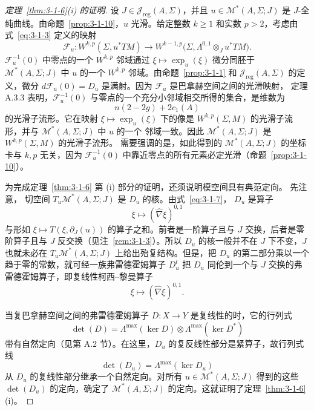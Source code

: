 \begin{proof}[定理~\ref{thm:3-1-6}\textup{(i)} 的证明]
设 $J\in\mathcal J_{\mathrm{reg}}(A,\Sigma)$，并且
$u\in\mathcal M^*(A,\Sigma;J)$ 是 $J$-全纯曲线。由命题~\ref{prop:3-1-10}，$u$
光滑。给定整数 $k\ge1$ 和实数 $p>2$，考虑由式~\eqref{eq:3-1-3} 定义的映射
\[
  \mathcal F_u:W^{k,p}(\Sigma,u^*TM)
  \longrightarrow
  W^{k-1,p}\bigl(\Sigma,
  \Lambda^{0,1}\otimes_Ju^*TM\bigr).
\]
$\mathcal F_u^{-1}(0)$ 中零点的一个 $W^{k,p}$ 邻域通过
$\xi\mapsto\exp_u(\xi)$ 微分同胚于 $\mathcal M^*(A,\Sigma;J)$ 中 $u$ 的一个
$W^{k,p}$ 邻域。由命题~\ref{prop:3-1-1} 和
$\mathcal J_{\mathrm{reg}}(A,\Sigma)$ 的定义，微分
$d\mathcal F_u(0)=D_u$ 是满射。因为 $\mathcal F_u$ 是巴拿赫空间之间的光滑映射，
定理 A.3.3 表明，$\mathcal F_u^{-1}(0)$ 与零点的一个充分小邻域相交所得的集合，是维数为
\[
  n(2-2g)+2c_1(A)
\]
的光滑子流形。它在映射 $\xi\mapsto\exp_u(\xi)$ 下的像是
$W^{k,p}(\Sigma,M)$ 的光滑子流形，并与 $\mathcal M^*(A,\Sigma;J)$ 中 $u$ 的一个
邻域一致。因此 $\mathcal M^*(A,\Sigma;J)$ 是 $W^{k,p}(\Sigma,M)$ 的光滑子流形。
需要强调的是，如此得到的 $\mathcal M^*(A,\Sigma;J)$ 的坐标卡与 $k,p$ 无关，因为
$\mathcal F_u^{-1}(0)$ 中靠近零点的所有元素必定光滑（命题~\ref{prop:3-1-10}）。

为完成定理~\ref{thm:3-1-6} 第 \textup{(i)} 部分的证明，还须说明模空间具有典范定向。
先注意，
切空间 $T_u\mathcal M^*(A,\Sigma;J)$ 是 $D_u$ 的核。由式~\eqref{eq:3-1-7}，
$D_u$ 是算子
\[
  \xi\longmapsto(\widehat\nabla\xi)^{0,1}
\]
与形如 $\xi\mapsto T(\xi,\partial_J(u))$ 的算子之和。前者是一阶算子且与 $J$
交换，后者是零阶算子且与 $J$ 反交换（见注~\ref{rem:3-1-3}）。所以 $D_u$ 的核一般并不在 $J$
下不变，$J$ 也就未必在 $T_u\mathcal M^*(A,\Sigma;J)$ 上给出殆复结构。但是，把
$D_u$ 的第二部分乘以一个趋于零的常数，就可经一族弗雷德霍姆算子 $D_u^t$ 把 $D_u$
同伦到一个与 $J$ 交换的弗雷德霍姆算子，即复线性柯西--黎曼算子
\[
  \xi\longmapsto(\widehat\nabla\xi)^{0,1}.
\]

当复巴拿赫空间之间的弗雷德霍姆算子 $D:X\to Y$ 是复线性的时，它的行列式
\[
  \det(D)=\Lambda^{\max}(\ker D)\otimes
  \Lambda^{\max}(\ker D^*)
\]
带有自然定向（见第 A.2 节）。在这里，$D_u$ 的复反线性部分是紧算子，故行列式线
\[
  \det(D_u)=\Lambda^{\max}(\ker D_u)
\]
从 $D_u$ 的复线性部分继承一个自然定向。对所有
$u\in\mathcal M^*(A,\Sigma;J)$ 得到的这些 $\det(D_u)$ 的定向，确定了
$\mathcal M^*(A,\Sigma;J)$ 的定向。这就证明了定理~\ref{thm:3-1-6}\textup{(i)}。
\end{proof}

